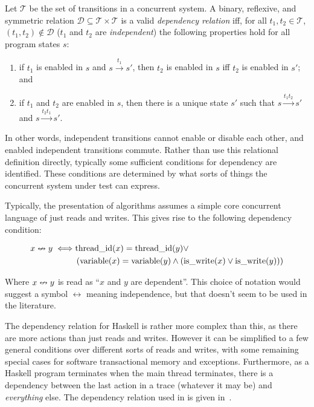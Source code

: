 \begin{displayquote}
  Let $\mathcal T$ be the set of transitions in a concurrent system.  A binary,
  reflexive, and symmetric relation
  $\mathcal D \subseteq \mathcal T \times \mathcal T$ is a valid
  \emph{dependency relation} iff, for all $t_{1}, t_{2} \in \mathcal T$,
  $(t_{1}, t_{2}) \notin \mathcal D$ ($t_{1}$ and $t_{2}$ are
  \emph{independent}) the following properties hold for all program states $s$:

  \begin{enumerate}
  \item if $t_{1}$ is enabled in $s$ and $s \xrightarrow{t_{1}} s'$, then
    $t_{2}$ is enabled in $s$ iff $t_{2}$ is enabled in $s'$; and

  \item if $t_{1}$ and $t_{2}$ are enabled in $s$, then there is a unique state
    $s'$ such that $s \xrightarrow{t_{1}t_{2}} s'$ and
    $s \xrightarrow{t_{2}t_{1}} s'$.
  \end{enumerate}
\end{displayquote}

In other words, independent transitions cannot enable or disable each other, and
enabled independent transitions commute.  Rather than use this relational
definition directly, typically some sufficient conditions for dependency are
identified.  These conditions are determined by what sorts of things the
concurrent system under test can express.

Typically, the presentation of algorithms assumes a simple core concurrent
language of just reads and writes.  This gives rise to the following dependency
condition:

\begin{align*}
  x \nleftrightarrow y \iff& \mathrm{thread\_id}(x) = \mathrm{thread\_id}(y) \lor\\
    &\left(\mathrm{variable}(x) = \mathrm{variable}(y)
     \land \left(\mathrm{is\_write}(x) \lor \mathrm{is\_write}(y)\right)\right)
\end{align*}

Where $x \nleftrightarrow y$ is read as ``$x$ and $y$ are dependent''.  This choice of
notation would suggest a symbol $\leftrightarrow$ meaning independence, but that
doesn't seem to be used in the literature.

The dependency relation for Haskell is rather more complex than this, as there
are more actions than just reads and writes.  However it can be simplified to a
few general conditions over different sorts of reads and writes, with some
remaining special cases for software transactional memory and exceptions.
Furthermore, as a Haskell program terminates when the main thread terminates,
there is a dependency between the last action in a trace (whatever it may be)
and \emph{everything} else.  The dependency relation used in \dejafu{} is given
in~.

